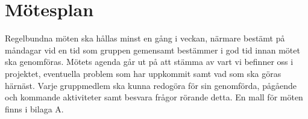 \section{Mötesplan}

Regelbundna möten ska hållas minst en gång i veckan, närmare bestämt på måndagar vid en tid som gruppen gemensamt bestämmer i god tid innan mötet ska genomföras. Mötets agenda går ut på att stämma av vart vi befinner oss i projektet, eventuella problem som har uppkommit samt vad som ska göras härnäst. Varje gruppmedlem ska kunna redogöra för sin genomförda, pågående och kommande aktiviteter samt besvara frågor rörande detta. En mall för möten finns i bilaga A.

